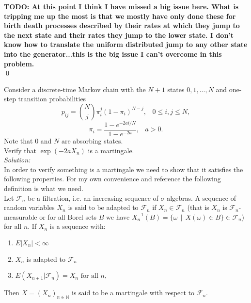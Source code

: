 \documentclass[10pt]{amsart}
\begin{document}
\noindent
\textbf{TODO: At this point I think I have missed a big issue here. What is tripping me up the most is that we mostly have only done these for birth death processes described by their rates at which they jump to the next state and their rates they jump to the lower state. I don't know how to translate the uniform distributed jump to any other state into the generator...this is the big issue I can't overcome in this problem.} \\
\qed \\
\newpage


 Consider a discrete-time Markov chain with the $N+1$ states $0,1,...,N$ and one-step transition probabilities
$$p_{ij}={N \choose j} \pi_i^j (1-\pi_i)^{N-j},  \,\,\,\,\, 0\leq i, j\leq N,$$ 
$$\pi_i=\frac{1-e^{-2ai/N}}{1-e^{-2a}}, \,\,\,\,\, a>0.$$
Note that $0$ and $N$ are absorbing states. 
\\

  Verify that $\exp(-2aX_n)$ is a martingale. \\

\noindent
\textit{Solution:} \\
In order to verify something is a martingale we need to show that it satisfies the following properties.
For my own convenience and reference the following definition is what we need. \\

\noindent
Let $\mathcal F_n$ be a filtration, i.e. an increasing sequence of $\sigma$-algebras.
A sequence of random variables $X_n$ is said to be adapted to $\mathcal F_n$ if $X_n \in \mathcal F_n$
(that is $X_n$ is $\mathcal F_n$-measurable or for all Borel sets $B$ we have $X_n^{-1}(B) = \{\omega \:\: | \:\: X(\omega) \in B\} \in \mathcal F_n$)
for all $n$.
If $X_n$ is a sequence with:
\begin{enumerate}
\item  $E | X_n | < \infty$
\item $X_n$ is adapted to $\mathcal F_n$
\item $E ( X_{n + 1} | \mathcal F_n ) = X_n \text{ for all } n$,
\end{enumerate}
Then $X = (X_n)_{n \in \mathbb N}$ is said to be a martingale with respect to $\mathcal F_n$. \\
\end{document}
